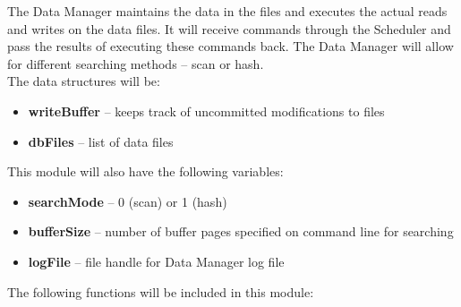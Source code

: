 The Data Manager maintains the data in the files and executes the actual reads and writes on the data files. It will receive commands through the Scheduler and pass the results of executing these commands back. The Data Manager will allow for different searching methods -- scan or hash. \\

The data structures will be:

\begin{itemize}
\item \textbf{writeBuffer} -- keeps track of uncommitted modifications to files
\item \textbf{dbFiles} -- list of data files
\end{itemize}

This module will also have the following variables:
\begin{itemize}
\item \textbf{searchMode} -- 0 (scan) or 1 (hash)
\item \textbf{bufferSize} -- number of buffer pages specified on command line for searching
\item \textbf{logFile} -- file handle for Data Manager log file
\end{itemize}

The following functions will be included in this module:\\

\noindent{}